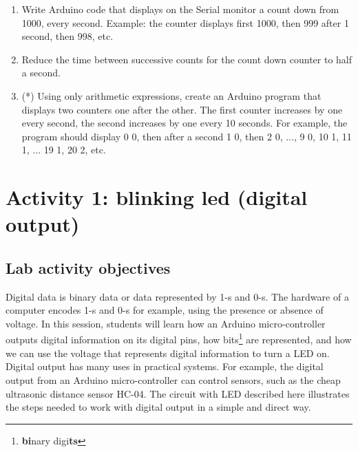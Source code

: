 \documentclass[12pt]{book}
\begin{document}
\begin{enumerate}[1.]
\item Write Arduino code that displays on the Serial monitor a count
  down from 1000, every second. Example: the counter displays first
  1000, then 999 after 1 second, then 998, etc.

\item Reduce the time between successive counts for the count down
  counter to half a second.

\item (*) Using only arithmetic expressions, create an Arduino program
  that displays two counters one after the other. The
  first counter increases by one every second, the second increases by
  one every 10 seconds. For example, the program should display 0 0,
  then after a second 1 0, then 2 0, ..., 9 0, 10 1, 11 1, ... 19 1,
  20 2, etc. 
\end{enumerate}



\chapter{Activity 1: blinking led (digital output)}\label{lab1.ch}

\section{Lab activity objectives}\label{lab1obj.se}

Digital data is binary data or data represented by 1-s and 0-s. The
hardware of a computer encodes 1-s and 0-s for example, using the
presence or absence of voltage. In this session, students will learn how an Arduino
micro-controller outputs digital information on its digital pins, how
bits\footnote{\textbf{bi}nary digi\textbf{ts}} are represented,
and how we can use the voltage that represents digital information to
turn a LED on. Digital output has many uses in practical systems. For
example, the digital output from an Arduino micro-controller can
control sensors, such as the cheap ultrasonic distance
sensor HC-04. The circuit with LED described here illustrates the
steps needed to work with digital output in a simple and direct way. 
\end{document}
